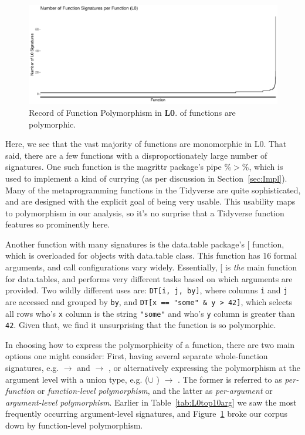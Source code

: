 \documentclass[acmsmall,10pt,review,anonymous]{acmart}\settopmatter{printfolios=true,printccs=false,printacmref=false}
\newcommand{\code}[1]{\lstinline|#1|\xspace}
\begin{document}
\begin{figure}[htbp]\begin{center}
\includegraphics[width=.9\textwidth]{L0_by_fun}
\caption{Record of Function Polymorphism in {\bf L0}. \LZEROPERCPOLY of functions are polymorphic.}
\label{fig:L0funcounts}\end{center}
\end{figure}

Here, we see that the vast majority of functions are monomorphic in L0.
That said, there are a few functions with a disproportionately large number of signatures.
One such function is the magrittr package's pipe \%$>$\%, which is used to implement a kind of currying (as per discussion in Section~\ref{sec:Impl}).
Many of the metaprogramming functions in the Tidyverse are quite sophisticated, and are designed with the explicit goal of being very usable.
This usability maps to polymorphism in our analysis, so it's no surprise that a Tidyverse function features so prominently here.

Another function with many signatures is the data.table package's [ function, which is overloaded for objects with data.table class.
This function has 16 formal arguments, and call configurations vary widely.
Essentially, [ is {\it the} main function for data.tables, and performs very different tasks based on which arguments are provided.
Two wildly different uses are:
\code{DT[i, j, by]}, where columns \code{i} and \code{j} are accessed and grouped by \code{by}, and \code{DT[x == "some" & y > 42]}, which selects all rows who's \code{x} column is the string \code{"some"} and who's \code{y} column is greater than \code{42}.
Given that, we find it unsurprising that the function is so polymorphic.

In choosing how to express the polymorphicity of a function, there are two main options one might consider:
First, having several separate whole-function signatures, e.g. \D $\rightarrow$ \D and \C $\rightarrow$ \D, or alternatively expressing the polymorphism at the argument level with a union type, e.g. (\D $\cup$ \C) $\rightarrow$ \C.
The former is referred to as {\it per-function} or {\it function-level polymorphism}, and the latter as {\it per-argument} or {\it argument-level polymorphism}.
Earlier in Table~\ref{tab:L0top10arg} we saw the most frequently occurring argument-level signatures, and Figure~\ref{fig:L0funcounts} broke our corpus down by function-level polymorphism.
\end{document}
